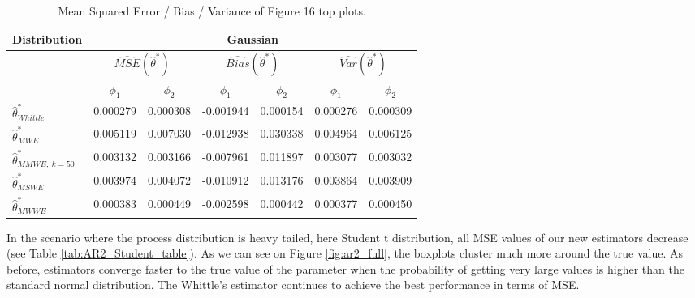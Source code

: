 \documentclass[
  11pt,
]{article}
\begin{document}
\begin{table}[h]
\centering
\begin{tabular}{|l|c|c|c|c|c|c|}
\hline
\multicolumn{1}{|c|}{\textbf{Distribution}} & \multicolumn{6}{c|}{\textbf{Gaussian}}                                                                                                                           \\ \hline
\textbf{}                                   & \multicolumn{2}{c|}{$\widehat{MSE}( \hat \theta^*)$} & \multicolumn{2}{c|}{$\widehat{Bias}( \hat \theta^*)$} & \multicolumn{2}{c|}{$\widehat{Var}( \hat \theta^*)$} \\ \hline
                                            & $\phi_1$                 & $\phi_2$                 & $\phi_1$                  & $\phi_2$                 & $\phi_1$                 & $\phi_2$                 \\ \hline
$\hat \theta^*_{Whittle}$                   & 0.000279                  & 0.000308                  & -0.001944                  & 0.000154                  & 0.000276                  & 0.000309                  \\ \hline
$\hat \theta^*_{MWE}$                       & 0.005119                  & 0.007030                  & -0.012938                  & 0.030338                  & 0.004964                  & 0.006125                  \\ \hline
$\hat \theta^*_{MMWE, \ k = 50}$            & 0.003132                  & 0.003166                  & -0.007961                  & 0.011897                  & 0.003077                  & 0.003032                  \\ \hline
$\hat \theta^*_{MSWE}$                      & 0.003974                  & 0.004072                  & -0.010912                  & 0.013176                  & 0.003864                  & 0.003909                  \\ \hline
$\hat \theta^*_{MWWE}$                      & 0.000383                  & 0.000449                  & -0.002598                  & 0.000442                  & 0.000377                  & 0.000450                  \\ \hline
\end{tabular}
\caption{Mean Squared Error / Bias / Variance of Figure 16 top plots.}
\label{tab:AR2_gaussian_table}
\end{table}

In the scenario where the process distribution is heavy tailed, here
Student t distribution, all MSE values of our new estimators decrease
(see Table \ref{tab:AR2_Student_table}). As we can see on Figure
\ref{fig:ar2_full}, the boxplots cluster much more around the true
value. As before, estimators converge faster to the true value of the
parameter when the probability of getting very large values is higher
than the standard normal distribution. The Whittle's estimator continues
to achieve the best performance in terms of MSE.
\end{document}
